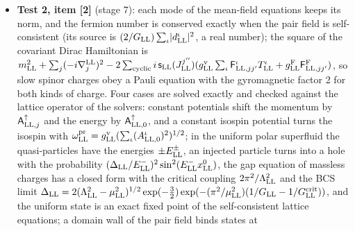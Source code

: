 \documentclass[
  10pt,
]{article}
\begin{document}
\begin{itemize}
  charges, on which the gauge group acts by the automorphisms of the
  super-loop and the Dirac matrices act by right multiplication with the
  frame; the covariant derivative
  \(\nabla^{\rm LL}_p=\partial_p+\Gamma^{\rm LL}_p-i\,\mathsf A_{{\rm LL},p}\)
  is a sum of super-loop derivations on the spinor charges; the Lorentz
  connection is fixed by the frame and is pure gauge on the flat
  manifold; the field equation
  \((i\sum_p\gamma^p_{\rm LL}\nabla^{\rm LL}_p-m_{\rm LL}+\mu_{\rm LL}\gamma^0_{\rm LL})\Psi_{\rm LL}+\tfrac12G_{\rm LL}\sum_\iota\gamma^0_{\rm LL}(\mathsf K^\iota_{\rm LL})^\dagger\Psi^*_{\rm LL}\Pi^\iota_{\rm LL}=0\)
  has no classical limit, and its mean-field form, the gauge-covariant
  Dirac-Bogoliubov-de Gennes equations, reproduces the gap equation of
  the superfluid; the lattice form keeps the gauge covariance exactly.
\item
  \textbf{Test 2, item {[}2{]}} (stage 7): each mode of the mean-field
  equations keeps its norm, and the fermion number is conserved exactly
  when the pair field is self-consistent (its source is
  \((2/G_{\rm LL})\sum_\iota\lvert d^\iota_{\rm LL}\rvert^2\), a real
  number); the square of the covariant Dirac Hamiltonian is
  \(m_{\rm LL}^2+\sum_j(-i\nabla^{\rm LL}_j)^2-2\sum_{\rm cyclic}i\,\mathsf s_{\rm LL}(J^{j''}_{\rm LL})(g^{\rm v}_{\rm LL}\sum_\iota\mathsf F^\iota_{{\rm LL},jj'}T^\iota_{\rm LL}+g^{\rm F}_{\rm LL}\mathsf F^{\rm F}_{{\rm LL},jj'})\),
  so slow spinor charges obey a Pauli equation with the gyromagnetic
  factor 2 for both kinds of charge. Four cases are solved exactly and
  checked against the lattice operator of the solvers: constant
  potentials shift the momentum by \(\mathsf A^\uparrow_{{\rm LL},j}\)
  and the energy by \(\mathsf A^\uparrow_{{\rm LL},0}\), and a constant
  isospin potential turns the isospin with
  \(\omega^{\rm pr}_{\rm LL}=g^{\rm v}_{\rm LL}(\sum_\iota(A^\iota_{{\rm LL},0})^2)^{1/2}\);
  in the uniform polar superfluid the quasi-particles have the energies
  \(\pm E^\pm_{\rm LL}\), an injected particle turns into a hole with
  the probability
  \((\Delta_{\rm LL}/E^-_{\rm LL})^2\sin^2(E^-_{\rm LL}x^0_{\rm LL})\),
  the gap equation of massless charges has a closed form with the
  critical coupling \(2\pi^2/\Lambda_{\rm LL}^2\) and the BCS limit
  \(\Delta_{\rm LL}=2(\Lambda_{\rm LL}^2-\mu_{\rm LL}^2)^{1/2}\exp(-\tfrac32)\exp(-(\pi^2/\mu_{\rm LL}^2)(1/G_{\rm LL}-1/G^{\rm crit}_{\rm LL}))\),
  and the uniform state is an exact fixed point of the self-consistent
  lattice equations; a domain wall of the pair field binds states at

\end{itemize}
\end{document}

